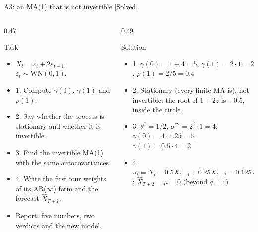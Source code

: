 \begin{frame}{A3: an MA(1) that is not invertible [Solved]}
\itemsize{\scriptsize}
\begin{columns}[T]
\begin{column}{0.47\textwidth}
\begin{block}{Task}
\begin{itemize}
    \item $X_t = \varepsilon_t + 2\varepsilon_{t-1}$, $\varepsilon_t \sim \mathrm{WN}(0, 1)$.
    \item 1. Compute $\gamma(0)$, $\gamma(1)$ and $\rho(1)$.
    \item 2. Say whether the process is stationary and whether it is invertible.
    \item 3. Find the invertible MA(1) with the same autocovariances.
    \item 4. Write the first four weights of its AR($\infty$) form and the forecast $\hat X_{T+2}$.
    \item Report: five numbers, two verdicts and the new model.
\end{itemize}
\end{block}
\end{column}
\begin{column}{0.49\textwidth}
\begin{exampleblock}{Solution}
\begin{itemize}
    \item 1. $\gamma(0) = 1 + 4 = 5$, $\gamma(1) = 2 \cdot 1 = 2$, $\rho(1) = 2/5 = 0.4$
    \item 2. Stationary (every finite MA is); not invertible: the root of $1 + 2z$ is $-0.5$, inside the circle
    \item 3. $\theta^* = 1/2$, $\sigma^{*2} = 2^2 \cdot 1 = 4$: $\gamma(0) = 4 \cdot 1.25 = 5$, $\gamma(1) = 0.5 \cdot 4 = 2$
    \item 4. $u_t = X_t - 0.5X_{t-1} + 0.25X_{t-2} - 0.125X_{t-3} + \dots$; $\hat X_{T+2} = \mu = 0$ (beyond $q = 1$)
\end{itemize}
\end{exampleblock}
\end{column}
\end{columns}
\end{frame}

